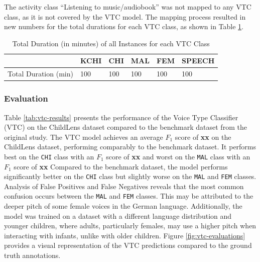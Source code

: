 \documentclass[
  man,floatsintext]{apa6}
\begin{document}
The activity class ``Listening to music/audiobook'' was not mapped to any VTC class, as it is not covered by the VTC model. The mapping process resulted in new numbers for the total durations for each VTC class, as shown in Table \ref{tab:vtc-classes-statistics}.

\begin{table}[tbp]

\begin{center}
\begin{threeparttable}

\caption{\label{tab:vtc-classes-statistics}Total Duration (in minutes) of all Instances for each VTC Class}

\begin{tabular}{llllll}
\toprule
 & \multicolumn{1}{c}{KCHI} & \multicolumn{1}{c}{CHI} & \multicolumn{1}{c}{MAL} & \multicolumn{1}{c}{FEM} & \multicolumn{1}{c}{SPEECH}\\
\midrule
Total Duration (min) & 100 & 100 & 100 & 100 & 100\\
\bottomrule
\end{tabular}

\end{threeparttable}
\end{center}

\end{table}

\subsubsection{Evaluation}\label{evaluation-1}

Table \ref{tab:vtc-results} presents the performance of the Voice Type Classifier (VTC) on the ChildLens dataset compared to the benchmark dataset from the original study. The VTC model achieves an average \(F_1\) score of \textbf{xx} on the ChildLens dataset, performing comparably to the benchmark dataset. It performs best on the \texttt{CHI} class with an \(F_1\) score of \textbf{xx} and worst on the \texttt{MAL} class with an \(F_1\) score of \textbf{xx} Compared to the benchmark dataset, the model performs significantly better on the \texttt{CHI} class but slightly worse on the \texttt{MAL} and \texttt{FEM} classes. Analysis of False Positives and False Negatives reveals that the most common confusion occurs between the \texttt{MAL} and \texttt{FEM} classes. This may be attributed to the deeper pitch of some female voices in the German language. Additionally, the model was trained on a dataset with a different language distribution and younger children, where adults, particularly females, may use a higher pitch when interacting with infants, unlike with older children.
Figure \ref{fig:vtc-evaluations} provides a visual representation of the VTC predictions compared to the ground truth annotations.
\end{document}
